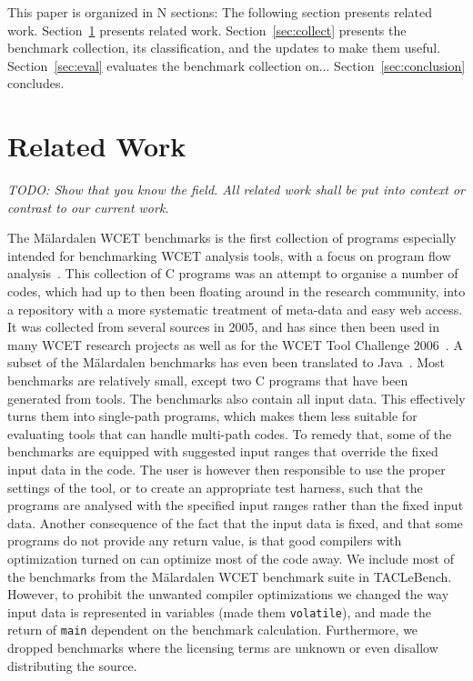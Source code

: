 \documentclass[a4paper,UKenglish]{oasics}
\newcommand{\todo}[1]{{\emph{TODO: #1}}}
\newcommand{\code}[1]{{\small{\texttt{#1}}}}
\begin{document}
This paper is organized in N sections: The following section presents related work.
Section~\ref{sec:related} presents related work.
Section~\ref{sec:collect} presents the benchmark collection, its classification, and the updates
to make them useful.
Section~\ref{sec:eval} evaluates the benchmark collection on...
Section~\ref{sec:conclusion} concludes.

\section{Related Work}
\label{sec:related}

\todo{Show that you know the field. All related work shall be put
into context or contrast to our current work.}

The M{\"a}lardalen WCET benchmarks is the first collection of programs especially
intended for benchmarking WCET analysis tools, with a focus on program flow analysis~\cite{wcet:bench:2012}.
This collection of C programs was an attempt to organise a number of codes, which had up to then been floating around
in the research community, into a repository with a more systematic treatment of meta-data and easy web access.
It was collected from several sources in 2005, and has since then been
used in many WCET research projects as well as for the WCET Tool Challenge 2006~\cite{Gustafsson:ISOLA2006}.
A subset of the M{\"a}lardalen benchmarks has even been translated to
Java~\cite{jop:volta:rtas2008}. Most benchmarks are relatively small, except
two C programs that have been generated from tools. The benchmarks also
contain all input data. This effectively turns them into single-path programs, which
makes them less suitable for evaluating tools that can handle multi-path codes. To remedy that,
some of the benchmarks are equipped with suggested input ranges that override the fixed
input data in the code. The user is however then responsible to use the proper settings of the tool,
or to create an appropriate test harness, such that the programs are analysed with the specified input ranges
rather than the fixed input data. Another consequence of the fact that the
input data is fixed, and that some programs do not provide
any return value, is that good compilers with optimization turned on can optimize
most of the code away. We include most of the benchmarks from the
 M{\"a}lardalen WCET benchmark suite in TACLeBench. However, to prohibit the unwanted compiler optimizations we changed
 the way input data is represented in variables (made them \code{volatile}),
 and made the return of \code{main} dependent on the benchmark calculation.
 Furthermore, we dropped benchmarks where the licensing terms are unknown
 or even disallow distributing the source.
\end{document}
